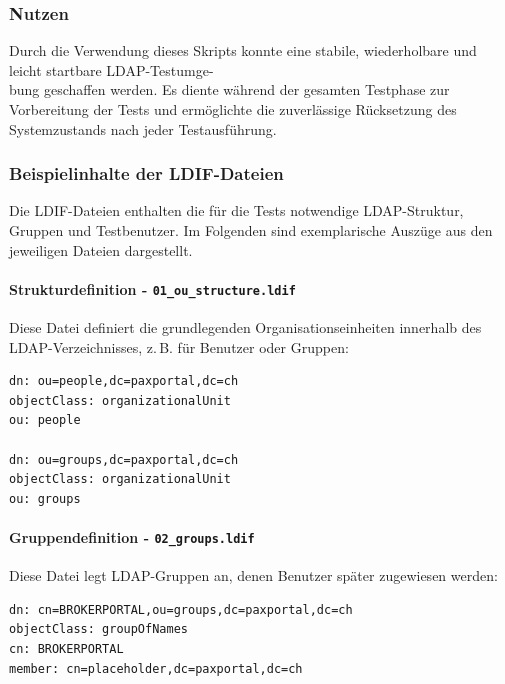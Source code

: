 \subsubsection*{Nutzen}

Durch die Verwendung dieses Skripts konnte eine stabile, wiederholbare und leicht startbare LDAP-Testumge- \\
bung geschaffen werden. Es diente während der gesamten Testphase zur Vorbereitung der Tests und ermöglichte die zuverlässige Rücksetzung des Systemzustands nach jeder Testausführung.



\subsubsection*{Beispielinhalte der LDIF-Dateien}

Die LDIF-Dateien enthalten die für die Tests notwendige LDAP-Struktur, Gruppen und Testbenutzer. Im Folgenden sind exemplarische Auszüge aus den jeweiligen Dateien dargestellt.

\paragraph{Strukturdefinition - \texttt{01\_ou\_structure.ldif}}

Diese Datei definiert die grundlegenden Organisationseinheiten innerhalb des LDAP-Verzeichnisses, z.\,B. für Benutzer oder Gruppen:

\begin{lstlisting}[language=bash, caption={Auszug aus \texttt{01\_ou\_structure.ldif}}]
dn: ou=people,dc=paxportal,dc=ch
objectClass: organizationalUnit
ou: people

dn: ou=groups,dc=paxportal,dc=ch
objectClass: organizationalUnit
ou: groups
\end{lstlisting}

\paragraph{Gruppendefinition - \texttt{02\_groups.ldif}}

Diese Datei legt LDAP-Gruppen an, denen Benutzer später zugewiesen werden:

\begin{lstlisting}[language=bash, caption={Auszug aus \texttt{02\_groups.ldif}}]
dn: cn=BROKERPORTAL,ou=groups,dc=paxportal,dc=ch
objectClass: groupOfNames
cn: BROKERPORTAL
member: cn=placeholder,dc=paxportal,dc=ch
\end{lstlisting}

